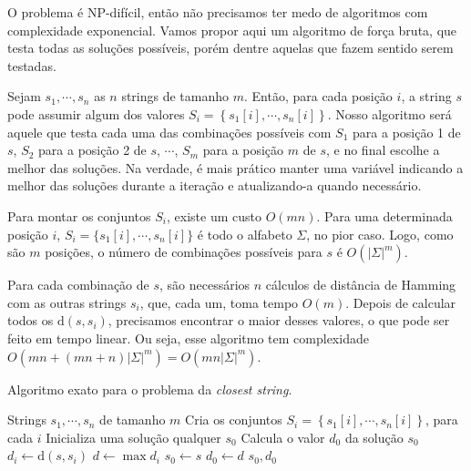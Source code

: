 O problema é NP-difícil, então não precisamos ter medo de algoritmos com complexidade exponencial. Vamos propor aqui um algoritmo de força bruta, que testa todas as soluções possíveis, porém dentre aquelas que fazem sentido serem testadas.

Sejam $s_1, \cdots, s_n$ as $n$ strings de tamanho $m$. Então, para cada posição $i$, a string $s$ pode assumir algum dos valores $S_i = \left\{s_1[i], \cdots, s_n[i]\right\}$. Nosso algoritmo será aquele que testa cada uma das combinações possíveis com $S_1$ para a posição 1 de $s$, $S_2$ para a posição 2 de $s$, $\cdots$, $S_m$ para a posição $m$ de $s$, e no final escolhe a melhor das soluções. Na verdade, é mais prático manter uma variável indicando a melhor das soluções durante a iteração e atualizando-a quando necessário.

Para montar os conjuntos $S_i$, existe um custo $O(mn)$. Para uma determinada posição $i$, $S_i = \{s_1[i], \cdots, s_n[i]\}$ é todo o alfabeto $\Sigma$, no pior caso. Logo, como são $m$ posições, o número de combinações possíveis para $s$ é $O(|\Sigma|^m)$.

Para cada combinação de $s$, são necessários $n$ cálculos de distância de Hamming com as outras strings $s_i$, que, cada um, toma tempo $O(m)$.
Depois de calcular todos os $\text{d}(s, s_i)$, precisamos encontrar o maior desses valores, o que pode ser feito em tempo linear.
Ou seja, esse algoritmo tem complexidade $O(mn + (mn+n)|\Sigma|^m) = O(mn|\Sigma|^m)$.

\begin{algorithm}
    \caption{Algoritmo exato para o problema da \textit{closest string}.}
    \label{alg:exact}
    \begin{algorithmic}
        \Require Strings $s_1, \cdots, s_n$ de tamanho $m$
        \State Cria os conjuntos $S_i = \left\{s_1[i], \cdots, s_n[i]\right\}$, para cada $i$
        \State Inicializa uma solução qualquer $s_0$
        \State Calcula o valor $d_0$ da solução $s_0$
                \State $d_i \gets \text{d}(s, s_i)$
            \EndFor
            \State $d \gets \max d_i$
                \State $s_0 \gets s$
                \State $d_0 \gets d$
            \EndIf
        \EndFor
        \State \Return $s_0, d_0$
    \end{algorithmic}
\end{algorithm}